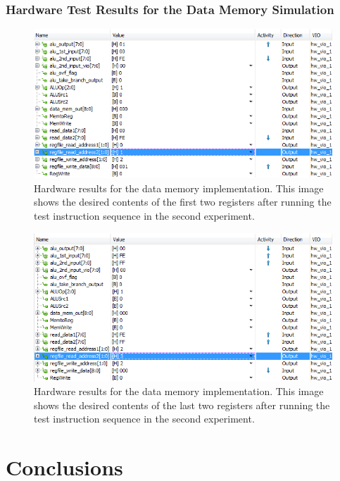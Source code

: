 \documentclass[12pt, letterpaper]{article}
\begin{document}
\FloatBarrier
\subsubsection{Hardware Test Results for the Data Memory Simulation}

\begin{figure}[h]
\includegraphics[width=\linewidth]{images/lab5-results-1.png}
\caption{Hardware results for the data memory implementation.  This image shows the desired contents of the first two registers after running the test instruction sequence in the second experiment.}
\end{figure}

\begin{figure}[h]
\includegraphics[width=\linewidth]{images/lab5-results-2.png}
\caption{Hardware results for the data memory implementation.  This image shows the desired contents of the last two registers after running the test instruction sequence in the second experiment.}
\end{figure}




\FloatBarrier\newpage
\section{Conclusions}
\end{document}
